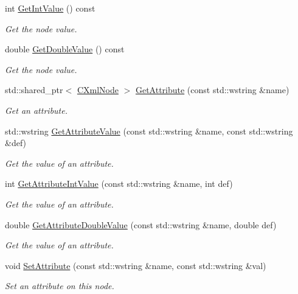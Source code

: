 \begin{DoxyCompactItemize}
int \hyperlink{classxmlnode_1_1_c_xml_node_a9eacb7b529d5690449fc0981b679edac}{Get\+Int\+Value} () const 
\begin{DoxyCompactList}\small\item\em Get the node value. \end{DoxyCompactList}\item 
double \hyperlink{classxmlnode_1_1_c_xml_node_a1ab9947b3e2f3aba9b6f044779b7e25b}{Get\+Double\+Value} () const 
\begin{DoxyCompactList}\small\item\em Get the node value. \end{DoxyCompactList}\item 
std\+::shared\+\_\+ptr$<$ \hyperlink{classxmlnode_1_1_c_xml_node}{C\+Xml\+Node} $>$ \hyperlink{classxmlnode_1_1_c_xml_node_aa571e6a48132a260420a077dde31168f}{Get\+Attribute} (const std\+::wstring \&name)
\begin{DoxyCompactList}\small\item\em Get an attribute. \end{DoxyCompactList}\item 
std\+::wstring \hyperlink{classxmlnode_1_1_c_xml_node_ac4b635b102a0ba6c0f64d047fd27f2a1}{Get\+Attribute\+Value} (const std\+::wstring \&name, const std\+::wstring \&def)
\begin{DoxyCompactList}\small\item\em Get the value of an attribute. \end{DoxyCompactList}\item 
int \hyperlink{classxmlnode_1_1_c_xml_node_a870618bd8862b8f3834613f469e56d25}{Get\+Attribute\+Int\+Value} (const std\+::wstring \&name, int def)
\begin{DoxyCompactList}\small\item\em Get the value of an attribute. \end{DoxyCompactList}\item 
double \hyperlink{classxmlnode_1_1_c_xml_node_a69fcfbe75f19450db6fe72908ce7c52e}{Get\+Attribute\+Double\+Value} (const std\+::wstring \&name, double def)
\begin{DoxyCompactList}\small\item\em Get the value of an attribute. \end{DoxyCompactList}\item 
void \hyperlink{classxmlnode_1_1_c_xml_node_ac2543c8908d29642f70c9ce437475bf1}{Set\+Attribute} (const std\+::wstring \&name, const std\+::wstring \&val)
\begin{DoxyCompactList}\small\item\em Set an attribute on this node. \end{DoxyCompactList}\item 

\end{DoxyCompactItemize}
